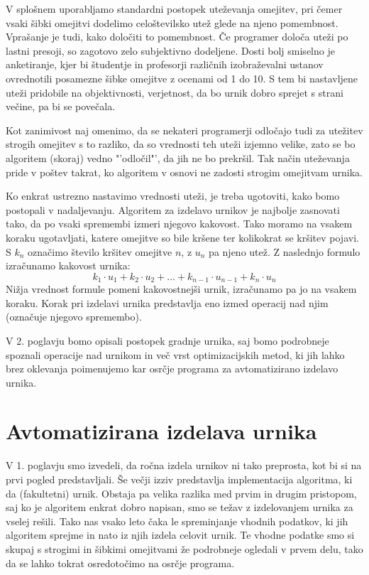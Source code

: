 \documentclass[10pt, a4paper]{article}
\begin{document}
V splošnem uporabljamo standardni postopek uteževanja omejitev, pri čemer vsaki šibki
omejitvi dodelimo celoštevilsko utež glede na njeno pomembnost. Vprašanje je tudi, kako
določiti to pomembnost. Če programer določa uteži po lastni presoji, so zagotovo zelo
subjektivno dodeljene. Dosti bolj smiselno je anketiranje, kjer bi študentje in profesorji
različnih izobraževalni ustanov ovrednotili posamezne šibke omejitve z ocenami od 1 do 10.
S tem bi nastavljene uteži pridobile na objektivnosti, verjetnost, da bo urnik dobro
sprejet s strani večine, pa bi se povečala.

Kot zanimivost naj omenimo, da se nekateri programerji odločajo tudi za utežitev strogih
omejitev s to razliko, da so vrednosti teh uteži izjemno velike, zato se bo algoritem
(skoraj) vedno "'odločil"', da jih ne bo prekršil. Tak način uteževanja pride v poštev
takrat, ko algoritem v osnovi ne zadosti strogim omejitvam urnika.

Ko enkrat ustrezno nastavimo vrednosti uteži, je treba ugotoviti, kako bomo postopali
v nadaljevanju. Algoritem za izdelavo urnikov je najbolje zasnovati tako, da po vsaki
spremembi izmeri njegovo kakovost. Tako moramo na vsakem koraku ugotavljati, katere
omejitve so bile kršene ter kolikokrat se kršitev pojavi. S $k_n$ označimo število
kršitev omejitve $n$, z $u_n$ pa njeno utež. Z naslednjo formulo izračunamo
kakovost urnika:
\[
   k_1 \cdot u_1 + k_2 \cdot u_2 + \ldots + k_{n-1} \cdot u_{n-1} + k_n \cdot u_n   
\]
Nižja vrednost formule pomeni kakovostnejši urnik, izračunamo pa jo na vsakem koraku.
Korak pri izdelavi urnika predstavlja eno izmed operacij nad njim (označuje njegovo
spremembo).

V 2. poglavju bomo opisali postopek gradnje urnika, saj bomo podrobneje spoznali
operacije nad urnikom in več vrst optimizacijskih metod, ki jih lahko brez oklevanja
poimenujemo kar osrčje programa za avtomatizirano izdelavo urnika.

\section{Avtomatizirana izdelava urnika}

V 1. poglavju smo izvedeli, da ročna izdela urnikov ni tako preprosta, kot bi si
na prvi pogled predstavljali. Še večji izziv predstavlja implementacija algoritma, ki da
(fakultetni) urnik. Obstaja pa velika razlika med prvim in drugim pristopom, saj ko je
algoritem enkrat dobro napisan, smo se težav z izdelovanjem urnika za vselej rešili.
Tako nas vsako leto čaka le spreminjanje vhodnih podatkov, ki jih algoritem sprejme in
nato iz njih izdela celovit urnik. Te vhodne podatke smo si skupaj s strogimi in šibkimi
omejitvami že podrobneje ogledali v prvem delu, tako da se lahko tokrat osredotočimo na
osrčje programa.
\end{document}
